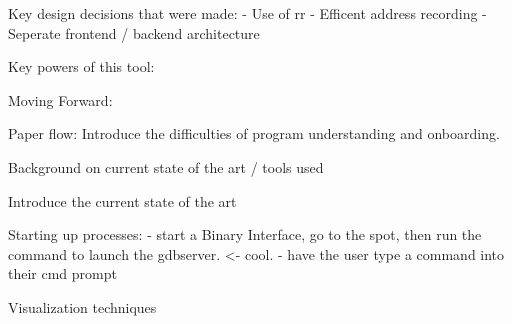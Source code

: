 \newpage %
\begin{doublespacing} %
\setcounter{page}{1} %


    






    

Key design decisions that were made: 
- Use of rr
- Efficent address recording
- Seperate frontend / backend architecture


Key powers of this tool:

Moving Forward:



Paper flow:
Introduce the difficulties of program understanding and onboarding.

Background on current state of the art / tools used

Introduce the current state of the art

Starting up processes:
- start a Binary Interface, go to the spot, then run the command to launch the gdbserver. <- cool.
    - have the user type a command into their cmd prompt

Visualization techniques









\end{doublespacing}
